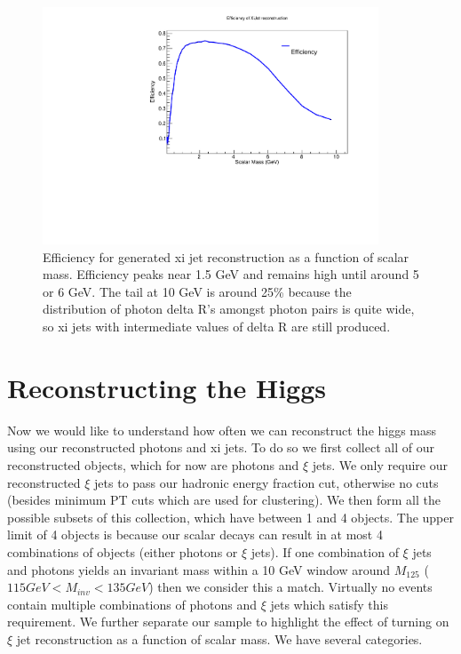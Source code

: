 \documentclass[aps,onecolumn,twoside,secnumarabic,balancelastpage,amsmath,amssymb,nofootinbib,hyperref=pdftex]{revtex4}
\begin{document}
\begin{figure}[t]
\begin{center}
\includegraphics[width=10cm]{Efficiency.pdf}

\caption{Efficiency for generated xi jet reconstruction as a function of scalar mass. Efficiency peaks near 1.5 GeV and remains high until around 5 or 6 GeV. The tail at 10 GeV is around 25\% because the distribution of photon delta R's amongst photon pairs is quite wide, so xi jets with intermediate values of delta R are still produced.}
\label{default}
\end{center}
\end{figure}

\section{Reconstructing the Higgs}
Now we would like to understand how often we can reconstruct the higgs mass using our reconstructed photons and xi jets. To do so we first collect all of our reconstructed objects, which for now are photons and $\xi$ jets. We only require our reconstructed $\xi$ jets to pass our hadronic energy fraction cut, otherwise no cuts (besides minimum PT cuts which are used for clustering). We then form all the possible subsets of this collection, which have between 1 and 4 objects. The upper limit of 4 objects is because our scalar decays can result in at most 4 combinations of objects (either photons or $\xi$ jets).  If one combination of $\xi$ jets and photons yields an invariant mass within a 10 GeV window around $M_{125}$ ($115 GeV < M_{inv} < 135 GeV$) then we consider this a match. Virtually no events contain multiple combinations of photons and $\xi$ jets which satisfy this requirement. We further separate our sample to highlight the effect of turning on $\xi$ jet reconstruction as a function of scalar mass. We have several categories.
\end{document}
